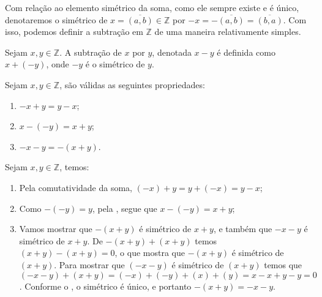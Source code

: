 \documentclass[../main.tex]{subfiles}
\begin{document}
\begin{obs}\label{int-obs-notacaoSimetrico}
    Com relação ao elemento simétrico da soma, como ele sempre existe e é único, denotaremos o simétrico de $x = \overline{(a,b)} \in \mathbb{Z}$ por $-x = -\overline{(a,b)} = \overline{(b,a)}$. Com isso, podemos definir a subtração em $\mathbb{Z}$ de uma maneira relativamente simples.  
\end{obs}

\begin{defi}\label{int-def-subtracao}
    Sejam $x,y \in \mathbb{Z}$. A subtração de $x$ por $y$, denotada $x - y$ é definida como $x + (-y)$, onde $-y$ é o simétrico de $y$.
\end{defi}
\begin{prop} 
    Sejam $x,y \in \mathbb{Z}$, são válidas as seguintes propriedades:
    \begin{enumerate}[label=(\roman*)]
        \item $-x + y = y - x$;
        \item $x - ( - y) = x+y$;
        \item $-x-y = -(x+y)$.
    \end{enumerate}
\end{prop}
\begin{dem}
    Sejam $x, y \in \mathbb{Z}$, temos:
        \begin{enumerate}[label=(\roman*)]
        \item Pela comutatividade da soma, $(-x) + y = y + (-x) = y-x$;
        \item Como $-(-y) = y$, pela , segue que $x - ( - y) = x+y$;
        \item Vamos mostrar que $-(x+y)$ é simétrico de $x+y$, e também que $-x-y$ é simétrico de $x+y$. De $-(x+y) + (x+y)$
            temos $(x+y) -(x+y) = 0$, o que mostra que $-(x+y)$ é simétrico de $(x+y)$. Para mostrar que $(-x-y)$ é simétrico de $(x+y)$ temos que 
            $(-x-y)+(x+y) = (-x)+(-y)+(x)+(y) = x-x+y-y = 0$. Conforme o , o simétrico é único, e portanto $-(x+y)=-x-y$.
    \end{enumerate}
\end{dem}
\end{document}
